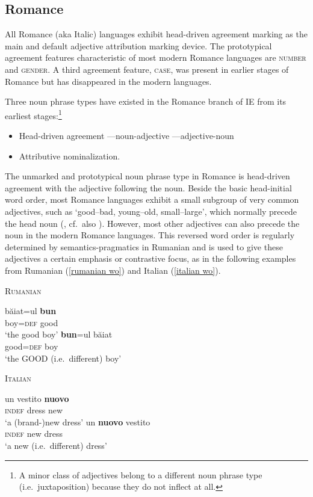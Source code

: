 \subsection{Romance}
All Romance (aka Italic) languages exhibit head-driven agreement marking as the main and default adjective attribution marking device. The prototypical agreement features characteristic of most modern Romance languages are \textsc{number} and \textsc{gender}. A third agreement feature, \textsc{case}, was present in earlier stages of Romance but has disappeared in the modern languages.

Three noun phrase types have existed in the Romance branch of IE from its earliest stages:\footnote{A minor class of adjectives belong to a different noun phrase type (i.e.~juxtaposition) because they do not inflect at all.}
\begin{itemize}
\item{Head-driven agreement}
	\subitem —noun-adjective
	\subitem —adjective-noun
\item{Attributive nominalization.}
\end{itemize}
The unmarked and prototypical noun phrase type in Romance is head-driven agreement with the adjective following the noun. Beside the basic head-initial word order, most Romance languages exhibit a small subgroup of very common adjectives, such as ‘good–bad, young–old, small–large’, which normally precede the head noun (\citealt[146–147]{posner1996}, cf.~also \citealt[340]{silvestri1998}). However, most other adjectives can also precede the noun in the modern Romance languages. This reversed word order is regularly determined by semantics-pragmatics in Rumanian and is used to give these adjectives a certain emphasis or contrastive focus, as in the following examples from Rumanian (\ref{rumanian wo}) and Italian (\ref{italian wo}).
\begin{exe}
\ex
\begin{xlist} 
\ex	\textsc{Rumanian} \citep{beyer-etal1987} \label{rumanian wo} 
\begin{xlist}
\ex	
\gll	băiat=ul \textbf{bun}\\
	boy=\textsc{def} good\\
\glt	‘the good boy’
\ex	
\gll	\textbf{bun}=ul băiat\\
	good=\textsc{def} boy\\
\glt	‘the GOOD (i.e.~different) boy’ 
\end{xlist}

\ex \textsc{Italian} \cite[146]{posner1996} \label{italian wo}
\begin{xlist}
\ex	
\gll	un vestito \textbf{nuovo}\\
	\textsc{indef} dress new\\
\glt	‘a (brand-)new dress’
\ex	
\gll	un \textbf{nuovo} vestito\\
	\textsc{indef} new dress\\
\glt	‘a new (i.e.~different) dress’
\end{xlist}
\end{xlist}
\end{exe}
